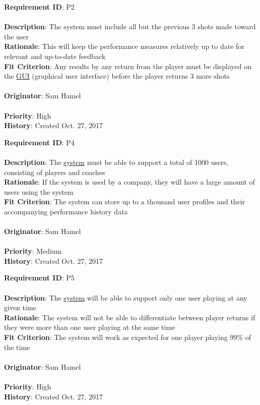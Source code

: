 \documentclass[11pt]{article}
\begin{document}
\begin{framed}
	\noindent\textbf{Requirement ID}: P2 \hfill\\\\
	\noindent\textbf{Description}: The system must include all but the previous 3 shots made toward the user  \\
	\textbf{Rationale}: This will keep the performance measures relatively up to date for relevant and up-to-date feedback \\
	\textbf{Fit Criterion}: Any results by any return from the player must be displayed on the \hyperref[sec:definitions]{GUI} (graphical user interface) before the player returns 3 more shots \\\\
	\textbf{Originator}: Sam Hamel \\\\
	\textbf{Priority}: High \hfill \\
	\noindent\textbf{History}: Created Oct. 27, 2017
\end{framed}

\begin{framed}
	\noindent\textbf{Requirement ID}: P4 \hfill\\\\
	\noindent\textbf{Description}: The \hyperref[sec:definitions]{system} must be able to support a total of 1000 users, consisting of players and coaches \\
	\textbf{Rationale}: If the system is used by a company, they will have a large amount of users using the system\\
	\textbf{Fit Criterion}: The system can store up to a thousand user profiles and their accompanying performance history data \\\\
	\textbf{Originator}: Sam Hamel \\\\
	\textbf{Priority}: Medium \hfill \\
	\noindent\textbf{History}: Created Oct. 27, 2017
\end{framed}

\begin{framed}
	\noindent\textbf{Requirement ID}: P5 \\\\
	\noindent\textbf{Description}: The \hyperref[sec:definitions]{system} will be able to support only one user playing at any given time \\
	\textbf{Rationale}: The system will not be able to differentiate between player returns if they were more than one user playing at the same time \\
	\textbf{Fit Criterion}: The system will work as expected for one player playing 99\% of the time \\\\
	\textbf{Originator}: Sam Hamel \\\\
	\textbf{Priority}: High \hfill \\
	\noindent\textbf{History}: Created Oct. 27, 2017
\end{framed}
\end{document}
